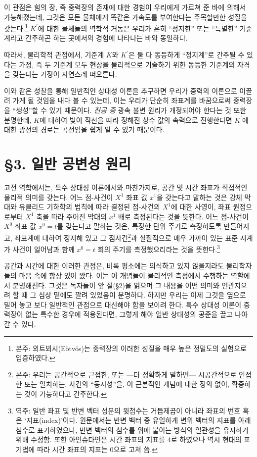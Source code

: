 \documentclass[b5paper]{article}
\begin{document}
이 관점은 힘의 장, 즉 중력장의 존재에 대한 경험이 우리에게 가르쳐 준 바에 의해서 가능해졌는데, 그것은 모든 물체에게 똑같은 가속도를 부여한다는 주목할만한 성질을 갖는다.\footnote{본주: 외트뵈시(E\"otv\"os)는 중력장의 이러한 성질을 매우 높은 정밀도의 실험으로 입증하였다.} $K^{\prime}$에 대한 물체들의 역학적 거동은 우리가 흔히 ``정지한'' 또는 ``특별한'' 기준계라고 간주하곤 하는 곳에서의 경험에 나타나는 바와 동일하다.

따라서, 물리학적 관점에서, 기준계 $ K $와 $ K^\prime $은 둘 다 동등하게 ``정지계''로 간주될 수 있다는 가정, 즉 두 기준계 모두 현상을 물리적으로 기술하기 위한 동등한 기준계의 자격을 갖는다는 가정이 자연스레 떠오른다.

이와 같은 성찰을 통해 일반적인 상대성 이론을 추구하면 우리가 중력의 이론으로 이끌려 가게 될 것임을 내다 볼 수 있는데, 이는 우리가 단순히 좌표계를 바꿈으로써 중력장을 ``생성''할 수 있기 때문이다. \emph{진공 중} 광속 불변 원리가 개정되어야 한다는 것 또한 분명한데, $K$에 대하여 빛이 직선을 따라 정해진 상수 값의 속력으로 진행한다면 $K^{\prime}$에 대한 광선의 경로는 곡선임을 쉽게 알 수 있기 때문이다. 

\section*{\S 3. 일반 공변성 원리}

고전 역학에서는, 특수 상대성 이론에서와 마찬가지로, 공간 및 시간 좌표가 직접적인 물리적 의미를 갖는다. 어느 점-사건이 $X^1$ 좌표 값 $x^1$을 갖는다고 말하는 것은 강체 막대와 유클리드 기하학의  법칙에 따라 결정된 점-사건의 $ X^1 $에 대한 사영이, 좌표 원점으로부터 $ X^1 $ 축을 따라 주어진 막대의 $ x^1 $ 배로 측정된다는 것을 뜻한다.  어느 점-사건이 $ X^0 $ 좌표 값 $ x^0=t $를 갖는다고 말하는 것은, 특정한 단위 주기로 측정하도록 만들어지고, 좌표계에 대하여 정지해 있고 그 점사건\footnote{본주: 우리는 공간적으로 근접한, 또는 ---더 정확하게 말하면--- 시공간적으로 인접한 또는 일치하는, 사건의 ``동시성''을, 이 근본적인 개념에 대한 정의 없이, 확증하는 것이 가능하다고 간주한다.}과 실질적으로 매우 가까이 있는 표준 시계가 사건이 일어남과 함께 $ x^0=t $ 회의 주기를 측정했으리라는 것을 뜻한다.\footnote{역주: 일반 좌표 및 반변 벡터 성분의 윗첨수는 거듭제곱이 아니라 좌표의 번호 혹은 `지표(index)'이다. 원문에서는 반변 벡터 중 유일하게 변위 벡터의 지표를 아래 첨수로 표기하였으나, 반변 벡터의 첨수를 위에 붙이는 방식의 일관성을 유지하기 위해 수정함. 또한 아인슈타인은 시간 좌표의 지표를 4로 하였으나 역시 현대의 표기법에 따라 시간 좌표의 지표는 0으로 고쳐 씀.}

공간과 시간에 대한 이러한 관점은, 비록 평소에는 의식하고 있지 않을지라도 물리학자들의 마음 속에 항상 있어 왔다. 이는 이 개념들이 물리적인 측정에서 수행하는 역할에서 분명해진다. 그것은 독자들이 앞 절(\S 2)을 읽으며 그 내용을 어떤 의미와 연관지으려 할 때 그 심상 밑에도 깔려 있었음이 분명하다. 하지만 우리는 이제 그것을 옆으로 밀어 놓고 보다 일반적인 관점으로 대신해야 함을 보이려 한다.  특수 상대성 이론이 중력장이 없는 특수한 경우에 적용된다면, 그렇게 해야 일반 상대성의 공준을 끌고 나아갈 수 있다.
\end{document}
